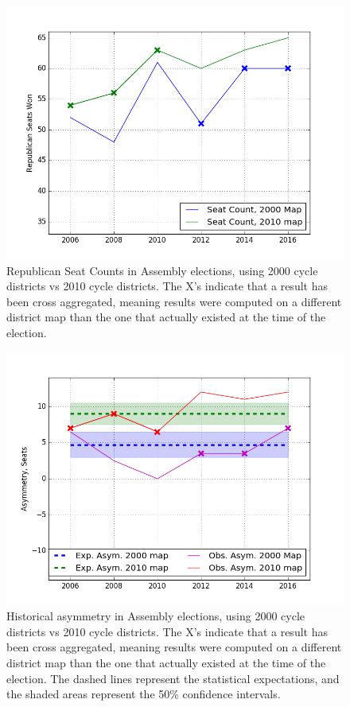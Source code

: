 \documentclass[preprint,12pt]{article}
\begin{document}
\begin{figure}[htb!]
    \begin{center}
        \includegraphics[scale=0.85]{../Figures/WI2010/WI_2000_2010_seats.png}
        \caption{Republican Seat Counts in Assembly elections, using 2000 cycle districts vs 2010 cycle districts. The X's indicate that a result has been cross aggregated, meaning results were computed on a different district map than the one that actually existed at the time of the election.}\label{fig:Seats20002010}
    \end{center}
\end{figure}

\begin{figure}[htb!]
    \begin{center}
        \includegraphics[scale=0.85]{../Figures/WI2010/WI_2000_2010.png}
        \caption{Historical asymmetry in Assembly elections, using 2000 cycle districts vs 2010 cycle districts. The X's indicate that a result has been cross aggregated, meaning results were computed on a different district map than the one that actually existed at the time of the election.  The dashed lines represent the statistical expectations, and the shaded areas represent the 50\% confidence intervals.}\label{fig:Asym20002010}
    \end{center}
\end{figure}
\end{document}

